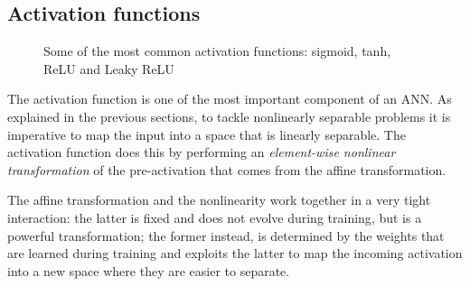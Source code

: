\subsection{Activation functions}\label{sec:activations}
\begin{figure}[h]
    \centering
    \caption{Some of the most common activation functions: sigmoid, tanh, ReLU
        and Leaky ReLU\label{fig:activations}}
\end{figure}

The activation function is one of the most important component of an ANN. As
explained in the previous sections, to tackle nonlinearly separable problems it
is imperative to map the input into a space that is linearly separable. The
activation function does this by performing an \emph{element-wise nonlinear
transformation} of the pre-activation that comes from the affine
transformation.

The affine transformation and the nonlinearity work together in a very tight
interaction: the latter is fixed and does not evolve during training, but
is a powerful transformation; the former instead, is determined by the weights
that are learned during training and exploits the latter to map the incoming
activation into a new space where they are easier to separate.

